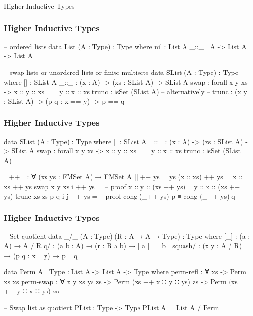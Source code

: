 \documentclass[9pt]{beamer}
\begin{document}
\begin{frame}[fragile]{Higher Inductive Types}
\frametitle{Higher Inductive Types}

\begin{code}
-- ordered lists
data List (A : Type) : Type where
  nil : List A
  _::_ : A -> List A -> List A

-- swap lists or unordered lists or finite multisets
data SList (A : Type) : Type where
  []    : SList A
  _::_  : (x : A) -> (xs : SList A) -> SList A
  swap  : forall x y xs -> x :: y :: xs == y :: x :: xs
  trunc : isSet (SList A)
  -- alternatively
  -- trunc : (x y : SList A) -> (p q : x == y) -> p == q
\end{code}

\end{frame}

\begin{frame}[fragile]
\frametitle{Higher Inductive Types}
\begin{code}
data SList (A : Type) : Type where
  []    : SList A
  _::_  : (x : A) -> (xs : SList A) -> SList A
  swap  : forall x y xs -> x :: y :: xs == y :: x :: xs
  trunc : isSet (SList A)

_++_ : ∀ (xs ys : FMSet A) → FMSet A
[] ++ ys = ys
(x :: xs) ++ ys = x :: xs ++ ys
swap x y xs i ++ ys =
  -- proof x :: y :: (xs ++ ys) ≡ y :: x :: (xs ++ ys)
trunc xs zs p q i j ++ ys =
  -- proof cong (_++ ys) p ≡ cong (_++ ys) q
\end{code}

\end{frame}

\begin{frame}[fragile]
\frametitle{Higher Inductive Types}
\begin{code}
-- Set quotient
data _/_ (A : Type) (R : A → A → Type) : Type where
  [_] : (a : A) → A / R
  q/ : (a b : A) → (r : R a b) → [ a ] ≡ [ b ]
  squash/ : (x y : A / R) → (p q : x ≡ y) → p ≡ q

data Perm {A : Type} : List A -> List A -> Type where
  perm-refl : ∀ {xs} -> Perm xs xs
  perm-swap : ∀ {x y xs ys zs}
    -> Perm (xs ++ x ∷ y ∷ ys) zs
    -> Perm (xs ++ y ∷ x ∷ ys) zs

-- Swap list as quotient
PList : Type -> Type
PList A = List A / Perm
\end{code}

\end{frame}
\end{document}
